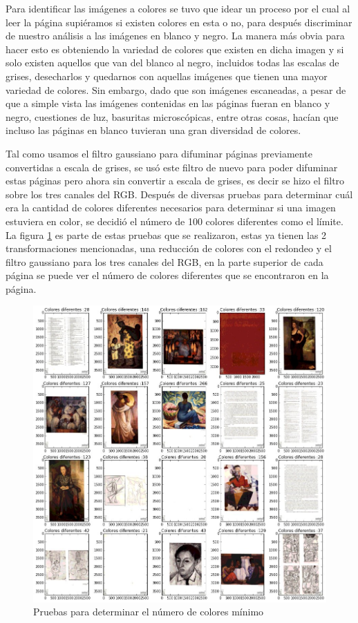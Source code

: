 Para identificar las imágenes a colores se tuvo que idear un proceso por el cual al leer la página supiéramos si existen colores en esta o no, para después discriminar de nuestro análisis a las imágenes en blanco y negro. La manera más obvia para hacer esto es obteniendo la variedad de colores que existen en dicha imagen y si solo existen aquellos que van del blanco al negro, incluidos todas las escalas de grises, desecharlos y quedarnos con aquellas imágenes que tienen una mayor variedad de colores. Sin embargo, dado que son imágenes escaneadas, a pesar de que a simple vista las imágenes contenidas en las páginas fueran en blanco y negro, cuestiones de luz, basuritas microscópicas, entre otras cosas, hacían que incluso las páginas en blanco tuvieran una gran diversidad de colores.

Tal como usamos el filtro gaussiano para difuminar páginas previamente convertidas a escala de grises, se usó este filtro de nuevo para poder difuminar estas páginas pero ahora sin convertir a escala de grises, es decir se hizo el filtro sobre los tres canales del RGB.  Después de diversas pruebas para determinar cuál era la cantidad de colores diferentes necesarios para determinar si una imagen estuviera en color, se decidió el número de 100 colores diferentes como el límite. La figura \ref{fig:pruebas-colores} es parte de estas pruebas que se realizaron, estas ya tienen las 2 transformaciones mencionadas, una reducción de colores con el redondeo y el filtro gaussiano para los tres canales del RGB, en la parte superior de cada página se puede ver el número de colores diferentes que se encontraron en la página.

\begin{figure}[H]
\centering
\includegraphics[width=1\textwidth]{Figures/identificar_colores.jpg}
\caption{Pruebas para determinar el número de colores mínimo}
\label{fig:pruebas-colores}
\end{figure}


